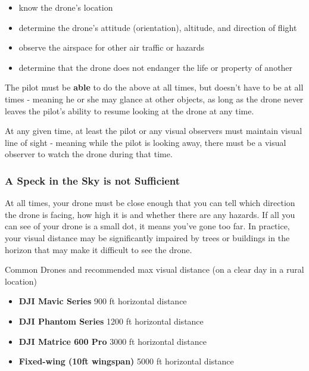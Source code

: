 \documentclass[
  12pt,
]{book}
\providecommand{\tightlist}{%
  \setlength{\itemsep}{0pt}\setlength{\parskip}{0pt}}
\begin{document}
\begin{itemize}
\tightlist
\item
  know the drone's location
\item
  determine the drone's attitude (orientation), altitude, and direction of flight
\item
  observe the airspace for other air traffic or hazards
\item
  determine that the drone does not endanger the life or property of another
\end{itemize}

The pilot must be \textbf{able} to do the above at all times, but doesn't have to be at all times - meaning he or she may glance at other objects, as long as the drone never leaves the pilot's ability to resume looking at the drone at any time.

At any given time, at least the pilot or any visual observers must maintain visual line of sight - meaning while the pilot is looking away, there must be a visual observer to watch the drone during that time.

\hypertarget{a-speck-in-the-sky-is-not-sufficient}{%
\subsubsection{A Speck in the Sky is not Sufficient}\label{a-speck-in-the-sky-is-not-sufficient}}

At all times, your drone must be close enough that you can tell which direction the drone is facing, how high it is and whether there are any hazards. If all you can see of your drone is a small dot, it means you've gone too far. In practice, your visual distance may be significantly impaired by trees or buildings in the horizon that may make it difficult to see the drone.

Common Drones and recommended max visual distance (on a clear day in a rural location)

\begin{itemize}
\tightlist
\item
  \textbf{DJI Mavic Series} 900 ft horizontal distance
\item
  \textbf{DJI Phantom Series} 1200 ft horizontal distance
\item
  \textbf{DJI Matrice 600 Pro} 3000 ft horizontal distance
\item
  \textbf{Fixed-wing (10ft wingspan)} 5000 ft horizontal distance
\end{itemize}
\end{document}
